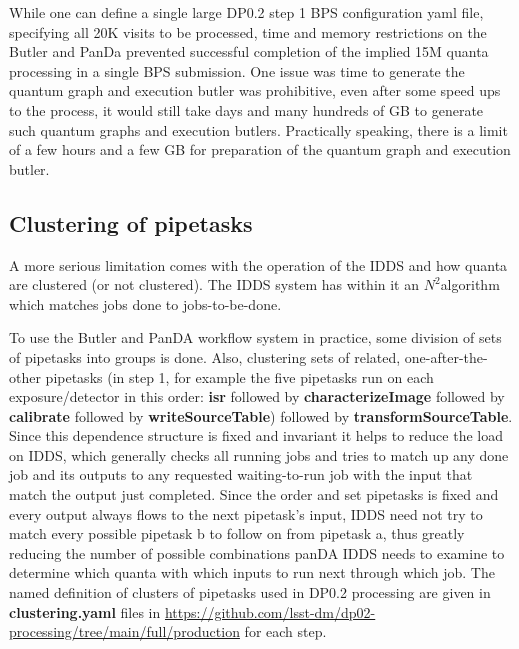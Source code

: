 \documentclass[OPS,authoryear,toc]{lsstdoc}
\begin{document}
While one can define a single large DP0.2 step 1 BPS configuration yaml file,
specifying all 20K visits to be processed, time and memory restrictions
on the Butler and PanDa prevented successful completion of the implied 
15M quanta processing in a single BPS submission.
One issue was time to generate the quantum graph and execution butler was
prohibitive, even after some speed ups to the process, it would still take
days and many hundreds of GB to generate such quantum graphs and execution
butlers.  Practically speaking, there is a limit of a few hours and a few GB
for preparation of the quantum graph and execution butler.  

\subsection{Clustering of pipetasks}
A more serious limitation comes with the operation of the IDDS and how
quanta are clustered (or not clustered).  The IDDS system has within it an $N^2$algorithm which matches jobs done to jobs-to-be-done.

To use the Butler and PanDA workflow system in practice, some division of
sets of pipetasks into groups is done.  Also, clustering sets of related, 
one-after-the-other pipetasks (in step 1, for example the five pipetasks run on
each exposure/detector in this order: {\bf isr} followed by 
{\bf characterizeImage} followed by {\bf calibrate} followed by 
{\bf writeSourceTable}) followed by  {\bf transformSourceTable}.  Since this
dependence structure is fixed and invariant it helps to reduce the load 
on IDDS, which generally checks all running jobs and tries to match up
any done job and its outputs to any requested waiting-to-run job with the input that match the output just completed. Since the 
order and set pipetasks is fixed and every output always flows to the
next pipetask's input, IDDS need not try to match every possible pipetask b 
to follow on from pipetask a, thus greatly reducing the number of possible
combinations panDA IDDS needs to examine to determine which quanta with which
inputs to run next through which job.  The named definition of clusters 
of pipetasks used in DP0.2 processing are 
given in {\bf clustering.yaml} files in 
\url{https://github.com/lsst-dm/dp02-processing/tree/main/full/production} 
for each step.  
\end{document}
